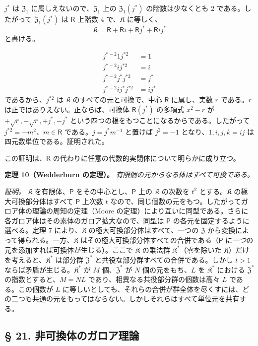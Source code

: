 $j^*$ は $\mathfrak Z_1$ に属しえないので、$\mathfrak Z_1$ 上の $\mathfrak Z_1(j^*)$ の階数は少なくとも $2$ である。したがって $\mathfrak Z_1(j^*)$ は $\mathsf{R}$ 上階数 $4$ で、$\mathfrak K$ に等しく、
\[
\mathfrak K=\mathsf R+\mathsf Ri+\mathsf Rj^*+\mathsf Rij^*
\]
と書ける。

\[
\begin{aligned}
j^{*-2}1j^{*2}&=1\\
j^{*-2}ij^{*2}&=i\\
j^{*-2}j^*j^{*2}&=j^*\\
j^{*-2}ij^*j^{*2}&=ij^*
\end{aligned}
\]
であるから、$j^{*2}$ は $\mathfrak K$ のすべての元と可換で、中心 $\mathsf{R}$ に属し、実数 $r$ である。$r$ は正ではありえない。正ならば、可換体 $\mathsf{R}(j^*)$ の多項式 $x^2-r$ が $+\sqrt r,-\sqrt r,+j^*,-j^*$ という四つの根をもつことになるからである。したがって $j^{*2}=-m^2$、$m\in \mathsf{R}$ である。$j=j^*m^{-1}$ と置けば $j^2=-1$ となり、$1,i,j,k=ij$ は四元数単位である。証明された。

この証明は、$\mathsf{R}$ の代わりに任意の代数的実閉体について明らかに成り立つ。

\textbf{定理 10（Wedderburn の定理）。} \emph{有限個の元からなる体はすべて可換である。}

\emph{証明。} $\mathfrak K$ を有限体、$\mathsf P$ をその中心とし、$\mathsf P$ 上の $\mathfrak K$ の次数を $t^2$ とする。$\mathfrak K$ の極大可換部分体はすべて $\mathsf P$ 上次数 $t$ なので、同じ個数の元をもつ。したがってガロア体の理論の周知の定理（Moore の定理）により互いに同型である。さらに各ガロア体はその素体のガロア拡大なので、同型は $\mathsf P$ の各元を固定するように選べる。定理 7 により、$\mathfrak K$ の極大可換部分体はすべて、一つの $\mathfrak Z$ から変換によって得られる。一方、$\mathfrak K$ はその極大可換部分体すべての合併である（$\mathsf P$ に\emph{一つ}の元を添加すれば可換体が生じる）。ここで $\mathfrak K$ の乗法群 $\mathfrak K^*$（零を除いた $\mathfrak K$）だけを考えると、$\mathfrak K^*$ は部分群 $\mathfrak Z^*$ と共役な部分群すべての合併である。しかし $t>1$ ならば矛盾が生じる。$\mathfrak K^*$ が $M$ 個、$\mathfrak Z^*$ が $N$ 個の元をもち、$L$ を $\mathfrak K^*$ における $\mathfrak Z^*$ の指数とすると、$M=NL$ であり、相異なる共役部分群の個数は高々 $L$ である。この個数が $L$ に等しいとしても、それらの合併が群全体を尽くすには、どの二つも共通の元をもってはならない。しかしそれらはすべて単位元を共有する。

\subsection*{§ 21. 非可換体のガロア理論}\label{die-galoissche-theorie-der-nichtkommutativen-koerper}

